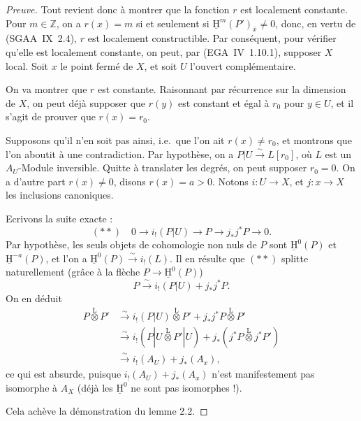 \documentclass[11pt]{article}
\providecommand{\uH}{\underline{\mathrm H}}
\newcommand{\Z}{\mathbb{Z}}
\newcommand{\ol}[1]{\overline{#1}}
\providecommand{\Z}{\mathbb Z}
\begin{document}
\begin{proof}[Preuve]
Tout revient donc à montrer que la fonction $r$ est localement constante. Pour $m \in \Z$, on a $r(x) = m$ si et seulement si $\uH^{m}(P')_{\ol{x}} \neq 0$, donc, en vertu de (SGAA~IX~2.4), $r$ est localement constructible. Par conséquent, pour vérifier qu'elle est localement constante, on peut, par (EGA~IV~1.10.1), supposer $X$ local. Soit $x$ le point fermé de $X$, et soit $U$ l'ouvert complémentaire.

On va montrer que $r$ est constante. Raisonnant par récurrence sur la dimension de $X$, on peut déjà supposer que $r(y)$ est constant et égal à $r_0$ pour $y \in U$, et il s'agit de prouver que $r(x) = r_0$.

Supposons qu'il n'en soit pas ainsi, i.e.~que l'on ait $r(x) \neq r_0$, et montrons que l'on aboutit à une contradiction. Par hypothèse, on a $P|U \xrightarrow{\sim} L[r_0]$, où $L$ est un $A_U$-Module inversible. Quitte à translater les degrés, on peut supposer $r_0 = 0$. On a d'autre part $r(x) \neq 0$, disons $r(x) = a > 0$. Notons $i : U \to X$, et $j : x \to X$ les inclusions canoniques.

Ecrivons la suite exacte :
\[
(**) \quad 0 \longrightarrow i_{!}(P|U) \longrightarrow P \longrightarrow j_{*}j^{*}P \longrightarrow 0.
\]
Par hypothèse, les seuls objets de cohomologie non nuls de $P$ sont $\uH^{0}(P)$ et $\uH^{-a}(P)$, et l'on a $\uH^{0}(P) \xrightarrow{\sim} i_{!}(L)$. Il en résulte que $(**)$ splitte naturellement (grâce à la flèche $P \to \uH^{0}(P)$)%
\[
P \xrightarrow{\sim} i_{!}(P|U) + j_{*}j^{*}P.
\]
On en déduit
\begin{align*}
P \mathop{\otimes}\limits^{\mathrm{L}} P' &\xrightarrow{\sim} i_{!}(P|U) \mathop{\otimes}\limits^{\mathrm{L}} P' + j_{*}j^{*}P \mathop{\otimes}\limits^{\mathrm{L}} P' \\
&\xrightarrow{\sim} i_{!}(P|U \mathop{\otimes}\limits^{\mathrm{L}} P'|U) + j_{*}(j^{*}P \mathop{\otimes}\limits^{\mathrm{L}} j^{*}P') \\
&\xrightarrow{\sim} i_{!}(A_U) + j_{*}(A_x),
\end{align*}
ce qui est absurde, puisque $i_{!}(A_U) + j_{*}(A_x)$ n'est manifestement pas isomorphe à $A_X$ (déjà les $\uH^{0}$ ne sont pas isomorphes !).

Cela achève la démonstration du lemme 2.2.
\end{proof}
\end{document}
